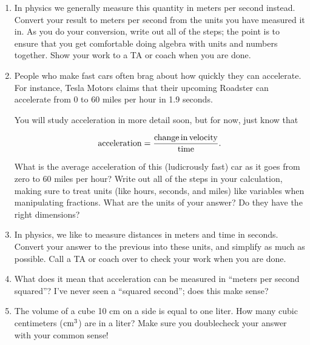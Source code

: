 \documentclass[12pt]{article}
\begin{document}
\begin{enumerate}
\item In physics we generally measure this quantity in meters per second instead. 
Convert your result to meters per second from the units you have measured it in. As you do your conversion, write out all of the 
steps; the point is to ensure that you get comfortable doing algebra with units and numbers together. Show your work to a TA
or coach when you are done.

\vspace{3in}

\newpage


\item People who make fast cars often brag about how quickly they can accelerate. For instance, Tesla Motors claims that
their upcoming Roadster can accelerate from 0 to 60 miles per hour in 1.9 seconds. 

You will study acceleration in more detail soon, but for now, just know that

$$
{\rm acceleration} = \frac{\rm change\, in\, velocity}{\rm time}.
$$

What is the average acceleration of this (ludicrously fast) car as it goes from zero to 60 miles per hour? Write out all of the
steps in your calculation, making sure to treat units (like hours, seconds, and miles) like variables when manipulating fractions.
What are the units of your answer? Do they have the right dimensions?

\vspace{2in}

\item In physics, we like to measure distances in meters and time in seconds. Convert your answer to the previous into these
units, and simplify as much as possible. Call a TA or coach over to check your work when you are done.

\vspace{2in}

\item What does it mean that acceleration can be measured in ``meters per second squared''? I've never seen a ``squared second'';
does this make sense?

\vspace{1in}

\item The volume of a cube 10 cm on a side is equal to one liter. How many cubic centimeters (${\rm cm}^3$) are in a liter?
Make sure you doublecheck your answer with your common sense!

\end{enumerate}
\end{document}
